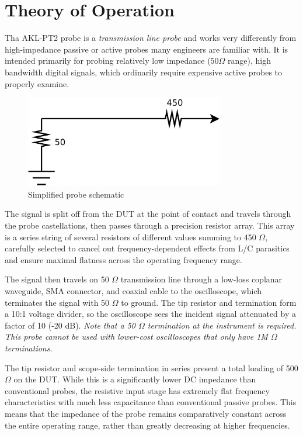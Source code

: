 \documentclass[11pt]{article}
\begin{document}
\pagebreak
\section{Theory of Operation}

Tha AKL-PT2 probe is a \emph{transmission line probe} and works very differently from high-impedance passive or active
probes many engineers are familiar with. It is intended primarily for probing relatively low impedance ($50 \Omega$
range), high bandwidth digital signals, which ordinarily require expensive active probes to properly examine.

\begin{figure}[h]
\centering
\includegraphics[height=4cm]{schematic.png}
\caption{Simplified probe schematic}
\label{schematic}
\end{figure}

The signal is split off from the DUT at the point of contact and travels through the probe castellations, then passes
through a precision resistor array. This array is a series string of several resistors of different values summing to
450 $\Omega$, carefully selected to cancel out frequency-dependent effects from L/C parasitics and ensure maximal
flatness across the operating frequency range.

The signal then travels on 50 $\Omega$ transmission line through a low-loss coplanar waveguide, SMA connector, and
coaxial cable to the oscilloscope, which terminates the signal with 50 $\Omega$ to ground. The tip resistor and
termination form a 10:1 voltage divider, so the oscilloscope sees the incident signal attenuated by a factor of 10 (-20
dB). \emph{Note that a 50 $\Omega$ termination at the instrument is required. This probe cannot be used with lower-cost
oscilloscopes that only have 1M $\Omega$ terminations.}

The tip resistor and scope-side termination in series present a total loading of 500 $\Omega$ on the DUT. While this is
a significantly lower DC impedance than conventional probes, the resistive input stage has extremely flat frequency
characteristics with much less capacitance than conventional passive probes. This means that the impedance of the probe
remains comparatively constant across the entire operating range, rather than greatly decreasing at higher frequencies.
\end{document}
